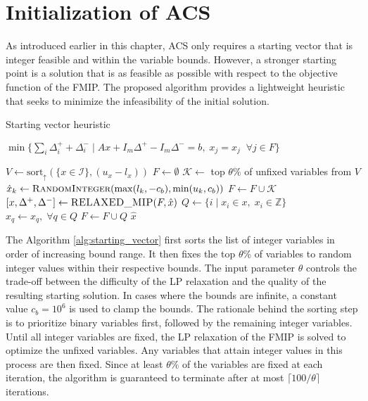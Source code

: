 \section{Initialization of ACS}
As introduced earlier in this chapter, ACS only requires a starting vector that is integer feasible and within the variable bounds. However, a stronger starting point is a solution that is as feasible as possible with respect to the objective function of the FMIP.
The proposed algorithm provides a lightweight heuristic that seeks to minimize the infeasibility of the initial solution.
\begin{algorithm}
\caption{Starting vector heuristic}\label{alg:starting_vector}
\begin{algorithmic}
    \State \Return $\min\{\sum_i \Delta_i^+ + \Delta_i^- \mid A x + I_m \Delta^+ - I_m \Delta^- = b, \; x_j = \hat{x}_j \;\; \forall j \in F\}$
\EndFunction
\end{algorithmic}
\vspace{1em}
\begin{algorithmic}[1]
\State $V \gets \text{sort}_\uparrow(\{x \in \mathcal{I}\}, (u_x-l_x))$
\State $F \gets \emptyset$
    \State $\mathcal{K} \gets$ top $\theta \%$ of unfixed variables from $V$
        \State $\hat{x}_k \gets \Call{RandomInteger}{\max(l_k, -c_b), \min(u_k, c_b)}$
    \EndFor
    \State $F \gets F \cup \mathcal{K}$
    \State $[x, \Delta^+, \Delta^-] \gets \Call{RELAXED\_MIP}{F,\hat{x}}$
    \State $Q \gets \{i \;|\; x_i \in x,\; x_i \in \mathbb{Z}\}$
    \State $\hat{x}_q \gets x_q, \; \forall q \in Q$
    \State $F \gets F \cup Q$
\EndWhile
\State \Return $\hat{x}$
\EndFunction
\end{algorithmic}
\end{algorithm}
The Algorithm \ref{alg:starting_vector} first sorts the list of integer variables in order of increasing bound range. It then fixes the top $\theta$\% of variables to random integer values within their respective bounds. The input parameter $\theta$ controls the trade-off between the difficulty of the LP relaxation and the quality of the resulting starting solution. In cases where the bounds are infinite, a constant value $c_b = 10^6$ is used to clamp the bounds.
The rationale behind the sorting step is to prioritize binary variables first, followed by the remaining integer variables.
Until all integer variables are fixed, the LP relaxation of the FMIP is solved to optimize the unfixed variables. Any variables that attain integer values in this process are then fixed.
Since at least $\theta$\% of the variables are fixed at each iteration, the algorithm is guaranteed to terminate after at most $\lceil 100 / \theta \rceil$ iterations.
